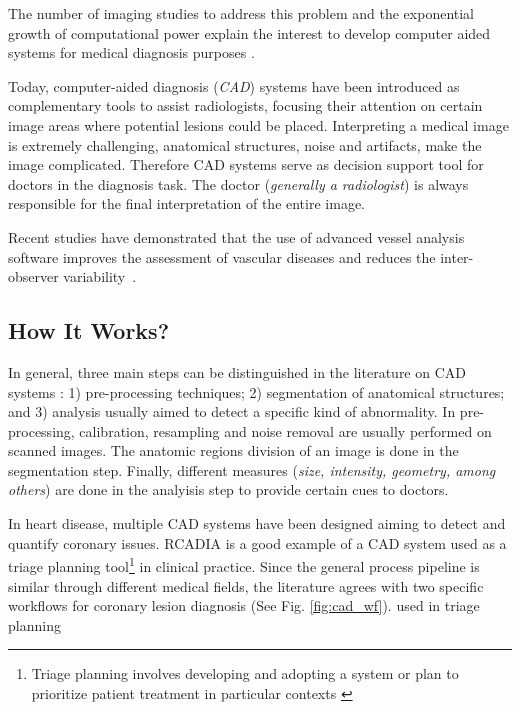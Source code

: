 The number of imaging studies to address this problem and the exponential growth of computational power explain the interest to develop computer aided systems for medical diagnosis purposes \citep{Ginneken2011}.

Today, computer-aided diagnosis (\textit{CAD}) systems have been introduced as complementary tools to assist radiologists, focusing their attention on certain image areas where potential lesions could be placed. Interpreting a medical image is extremely challenging, anatomical structures, noise and artifacts, make the image complicated. Therefore CAD systems serve as decision support tool for doctors in the diagnosis task. The doctor (\textit{generally a radiologist}) is always responsible for the final interpretation of the entire image. 

Recent studies have demonstrated that the use of advanced vessel analysis software improves the assessment of vascular diseases and reduces the inter-observer variability~\citep{DiCarli2007, Biermann2012}.

\subsection{How It Works?}

In general, three main steps can be distinguished in the literature on CAD systems \citep{Ginneken2001}: 1) pre-processing techniques; 2) segmentation of anatomical structures; and 3) analysis usually aimed to detect a specific kind of abnormality. In pre-processing, calibration, resampling and noise removal are usually performed on scanned images. The anatomic regions division of an image is done in the segmentation step. Finally, different measures (\textit{size, intensity, geometry, among others}) are done in the analyisis step to provide certain cues to doctors.

In heart disease, multiple CAD systems have been designed aiming to detect and quantify coronary issues. RCADIA \citep{Goldenberg2012} is a good example of a CAD system used as a triage planning tool\footnote{Triage planning involves developing and adopting a system or plan to prioritize patient treatment in particular contexts \citep{Iserson2007}} in clinical practice. Since the general process pipeline is similar through different medical fields, the literature \citep{Kirisli2013} agrees with two specific workflows for coronary lesion diagnosis (See Fig. \ref{fig:cad_wf}).
used in triage planning 



